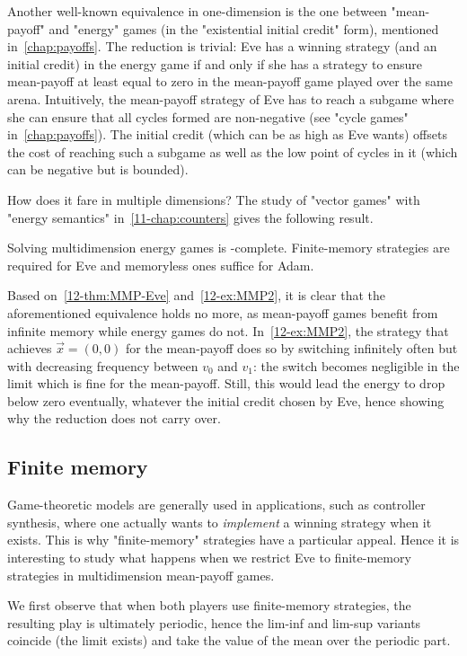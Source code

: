 Another well-known equivalence in one-dimension is the one between "mean-payoff" and "energy" games (in the "existential initial credit" form), mentioned in~\cref{chap:payoffs}. The reduction is trivial: Eve has a winning strategy (and an initial credit) in the energy game if and only if she has a strategy to ensure mean-payoff at least equal to zero in the mean-payoff game played over the same arena. Intuitively, the mean-payoff strategy of Eve has to reach a subgame where she can ensure that all cycles formed are non-negative (see "cycle games" in~\cref{chap:payoffs}). The initial credit (which can be as high as Eve wants) offsets the cost of reaching such a subgame as well as the low point of cycles in it (which can be negative but is bounded).

How does it fare in multiple dimensions? The study of "vector games" with "energy semantics" in~\cref{11-chap:counters} gives the following result.

\begin{theorem}
\label{12-thm:MEG}
Solving multidimension energy games is \coNP-complete. Finite-memory strategies are required for Eve and memoryless ones suffice for Adam.
\end{theorem} 

Based on~\cref{12-thm:MMP-Eve} and~\cref{12-ex:MMP2}, it is clear that the aforementioned equivalence holds no more, as mean-payoff games benefit from infinite memory while energy games do not. In~\cref{12-ex:MMP2}, the strategy that achieves $\vec{x} = (0, 0)$ for the mean-payoff does so by switching infinitely often but with decreasing frequency between $v_0$ and $v_1$: the switch becomes negligible in the limit which is fine for the mean-payoff. Still, this would lead the energy to drop below zero eventually, whatever the initial credit chosen by Eve, hence showing why the reduction does not carry over.


\subsection{Finite memory}

Game-theoretic models are generally used in applications, such as controller synthesis, where one actually wants to \textit{implement} a winning strategy when it exists. This is why "finite-memory" strategies have a particular appeal. Hence it is interesting to study what happens when we restrict Eve to finite-memory strategies in multidimension mean-payoff games. 

We first observe that when both players use finite-memory strategies, the resulting play is ultimately periodic, hence the lim-inf and lim-sup variants coincide (the limit exists) and take the value of the mean over the periodic part.

